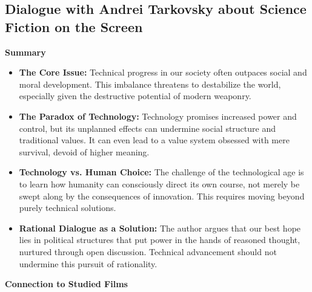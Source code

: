 \documentclass[11pt,fleqn]{book}
\begin{document}
\subsection{Dialogue with Andrei Tarkovsky about Science Fiction on the Screen}
\textbf{Summary}

\begin{itemize}
\item \textbf{The Core Issue:} Technical progress in our society often outpaces social and moral development. This imbalance threatens to destabilize the world, especially given the destructive potential of modern weaponry.

\item \textbf{The Paradox of Technology:} Technology promises increased power and control, but its unplanned effects can undermine social structure and traditional values. It can even lead to a value system obsessed with mere survival, devoid of higher meaning.

\item \textbf{Technology vs. Human Choice:} The challenge of the technological age is to learn how humanity can consciously direct its own course, not merely be swept along by the consequences of innovation. This requires moving beyond purely technical solutions. 

\item \textbf{Rational Dialogue as a Solution:}  The author argues that our best hope lies in political structures that put power in the hands of reasoned thought, nurtured through open discussion. Technical advancement should not undermine this pursuit of rationality.
\end{itemize}
\vspace{5pt}

\textbf{Connection to Studied Films}
\end{document}
